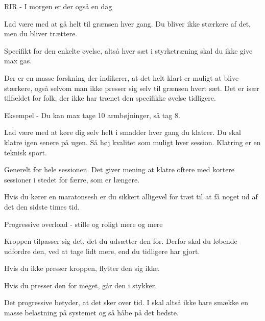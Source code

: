 \begin{multicols}{2}
  \begin{tList}{RIR - I morgen er der også en dag}

  \item Lad være med at gå helt til grænsen hver gang. Du bliver ikke
    stærkere af det, men du bliver trættere.

  \item Specifikt for den enkelte øvelse, altså hver sæt i
    styrketræning skal du ikke give max gas.
  \item Der er en masse forskning der indikerer, at det helt klart er
    muligt at blive stærkere, også selvom man ikke presser sig selv
    til grænsen hvert sæt. Det er især tilfældet for folk, der ikke
    har trænet den specifikke øvelse tidligere.
  \item Eksempel - Du kan max tage 10 armbøjninger, så tag 8.

  \item Lad være med at køre dig selv helt i smadder hver gang du
    klatrer. Du skal klatre igen senere på ugen. Så høj kvalitet som
    muligt hver session. Klatring er en teknisk sport.

  \item Generelt for hele sessionen. Det giver mening at klatre
    oftere med kortere sessioner i stedet for færre, som er længere.

  \item Hvis du kører en maratonsesh er du sikkert alligevel for træt
    til at få noget ud af det den sidste times tid.
  \end{tList}

  \begin{tList}{Progressive overload - stille og roligt mere og mere}

  \item Kroppen tilpasser sig det, det du udsætter den for. Derfor
    skal du løbende udfordre den, ved at tage lidt mere, end du
    tidligere har gjort.

  \item Hvis du ikke presser kroppen, flytter den sig ikke.
  \item Hvis du presser den for meget, går den i stykker.

  \item Det progressive betyder, at det sker over tid. I skal altså
    ikke bare smække en masse belastning på systemet og så håbe på det bedste.
  \end{tList}


\end{multicols}
